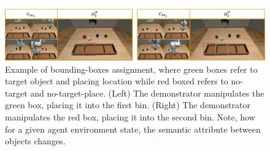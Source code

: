 \begin{figure}[t]
    \centering
    \includegraphics[width=1.0\textwidth]{figures/images/ch2/example_of_bb.jpg}
    \caption{Example of bounding-boxes assignment, where green boxes refer to target object and placing location while red boxed refers to no-target and no-target-place. (Left) The demonstrator manipulates the green box, placing it into the first bin. (Right) The demonstrator manipulates the red box, placing it into the second bin. Note, how for a given agent environment state, the semantic attribute between objects changes.}
    \label{fig:example_of_bb}
\end{figure}
